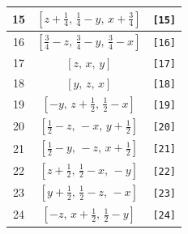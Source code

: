 \documentclass[fleqn,8pt]{jsarticle}
\begin{document}
\begin{longtable}{ccc}
15 & $\left[ z + \frac{1}{4},\, \frac{1}{4} - y,\, x + \frac{3}{4} \right]$ & {\tt [15]} \\ \hline
16 & $\left[ \frac{3}{4} - z,\, \frac{3}{4} - y,\, \frac{3}{4} - x \right]$ & {\tt [16]} \\ \hline
17 & $\left[ z,\, x,\, y \right]$ & {\tt [17]} \\ \hline
18 & $\left[ y,\, z,\, x \right]$ & {\tt [18]} \\ \hline
19 & $\left[ - y,\, z + \frac{1}{2},\, \frac{1}{2} - x \right]$ & {\tt [19]} \\ \hline
20 & $\left[ \frac{1}{2} - z,\, - x,\, y + \frac{1}{2} \right]$ & {\tt [20]} \\ \hline
21 & $\left[ \frac{1}{2} - y,\, - z,\, x + \frac{1}{2} \right]$ & {\tt [21]} \\ \hline
22 & $\left[ z + \frac{1}{2},\, \frac{1}{2} - x,\, - y \right]$ & {\tt [22]} \\ \hline
23 & $\left[ y + \frac{1}{2},\, \frac{1}{2} - z,\, - x \right]$ & {\tt [23]} \\ \hline
24 & $\left[ - z,\, x + \frac{1}{2},\, \frac{1}{2} - y \right]$ & {\tt [24]} \\
\end{longtable}
\end{document}
